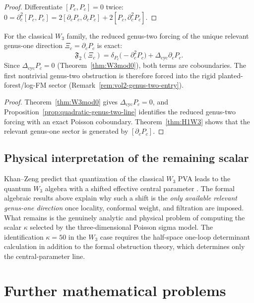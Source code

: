\begin{proof}
Differentiate $[P_c,P_c]=0$ twice:
$0=\partial_c^2[P_c,P_c]=2[\partial_cP_c,\partial_cP_c]+2[P_c,\partial_c^2P_c]$.
\end{proof}

\begin{corollary}
\label{cor:w3-no-quadratic-self-obstruction}
For the classical $W_3$ family, the reduced genus-two forcing of the
unique relevant genus-one direction $\Xi_c=\partial_cP_c$ is exact:
\[
\mathfrak{F}_2(\Xi_c)
=
\delta_{P_c}\bigl(-\partial_c^2P_c\bigr)
+\Delta_{\mathrm{cyc}}\partial_cP_c.
\]
Since $\Delta_{\mathrm{cyc}}P_c=0$
\textup{(}Theorem~\textup{\ref{thm:W3mod0})}, both terms are
coboundaries. The first nontrivial genus-two obstruction is
therefore forced into the rigid planted-forest/log-FM sector
\textup{(}Remark~\textup{\ref{rem:vol2-genus-two-entry})}.
\end{corollary}

\begin{proof}
Theorem~\ref{thm:W3mod0} gives $\Delta_{\mathrm{cyc}}P_c=0$, and
Proposition~\ref{prop:quadratic-genus-two-line} identifies the reduced
genus-two forcing with an exact Poisson coboundary. Theorem~\ref{thm:H1W3}
shows that the relevant genus-one sector is generated by $[\partial_cP_c]$.
\end{proof}

\subsection{Physical interpretation of the remaining scalar}

Khan--Zeng predict that quantization of the classical $W_3$ PVA leads to the quantum $W_3$
algebra with a shifted effective central parameter \cite{KZ25}. The formal algebraic
results above explain why such a shift is the \emph{only available relevant
genus-one direction} once locality, conformal weight, and filtration are imposed. What
remains is the genuinely analytic and physical problem of computing the scalar $\kappa$
selected by the three-dimensional Poisson sigma model. The identification
$\kappa=50$ in the $W_3$ case requires the half-space one-loop determinant calculation
in addition to the formal obstruction theory, which determines only the
central-parameter line.

\section{Further mathematical problems}

